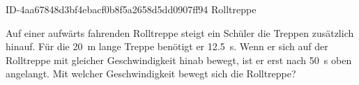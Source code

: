 \begin{exercise}
      {ID-4aa67848d3bf4ebacf0b8f5a2658d5dd0907ff94}
      {Rolltreppe}
  \ifproblem\problem\par
    Auf einer aufwärts fahrenden Rolltreppe steigt ein Schüler die Treppen
    zusätzlich hinauf. Für die \SI{20}{\metre} lange Treppe benötigt er
    \SI{12.5}{\second}. Wenn er sich auf der Rolltreppe mit gleicher
    Geschwindigkeit hinab bewegt, ist er erst nach \SI{50}{\second} oben
    angelangt. Mit welcher Geschwindigkeit bewegt sich die Rolltreppe?
  \fi
\end{exercise}
